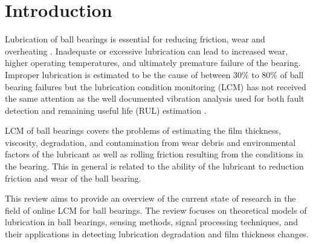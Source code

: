 
\section{Introduction}


Lubrication of ball bearings is essential for reducing friction, wear and overheating \cite{wakiru_review_2019} \cite{isalm_oil_2021}. Inadequate or excessive lubrication can lead to increased wear, higher operating temperatures, and ultimately premature failure of the bearing. Improper lubrication is estimated to be the cause of between 30\% to 80\% of ball bearing failures but the lubrication condition monitoring (LCM) has not received the same attention as the well documented vibration analysis used for both fault detection and remaining useful life (RUL) estimation \cite{jakobsen_detecting_2023} \cite{dai_situ_2024} \cite{xu_vibration-based_2024} \cite{nassef_impact_2022}.

LCM of ball bearings covers the problems of estimating the film thickness, viscosity, degradation, and contamination from wear debris and environmental factors of the lubricant as well as rolling friction resulting from the conditions in the bearing. This in general is related to the ability of the lubricant to reduction friction and wear of the ball bearing.

This review aims to provide an overview of the current state of research in the field of online LCM for ball bearings. The review focuses on theoretical models of lubrication in ball bearings, sensing methods, signal processing techniques, and their applications in detecting lubrication degradation and film thickness changes.


